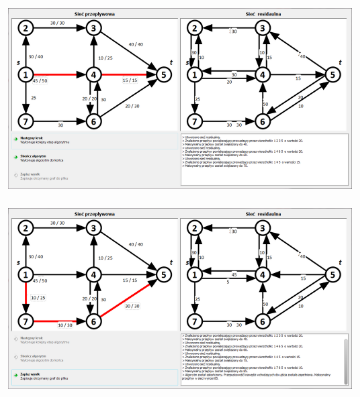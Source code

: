 \documentclass[a4paper]{book}
\begin{document}
\begin{appendices}
\begin{figure}[H]
\begin{subfigure}{\textwidth}
 		\end{subfigure}\par\bigskip
 		\begin{subfigure}{\textwidth}
 			\includegraphics[width=0.9\linewidth]{./img/spec_zew06_4.png}
 		\end{subfigure}\par\bigskip
 		\begin{subfigure}{\textwidth}
 			\includegraphics[width=0.9\linewidth]{./img/spec_zew06_5.png}
 		\end{subfigure}
 	\end{figure}
\end{appendices}
\end{document}
